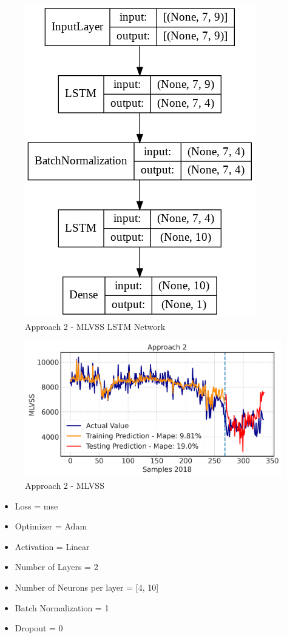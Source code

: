 \begin{figure}[h]
\centering
 \includegraphics[width=0.4\linewidth]{figures/Ch5/App2_MLVSS.png}
\caption{Approach 2 - MLVSS LSTM Network}
\label{f:App2-MLVSS-nn}
\end{figure}

\begin{figure}[h]
\centering
\includegraphics[width=\linewidth]{figures/Ch5/MVLSS-approach2.png}
\caption{Approach 2 - MLVSS}
\label{f:App2-MLVSS}
\end{figure}

\begin{itemize}
    \item Loss = mse
    \item Optimizer = Adam
    \item Activation =  Linear
    \item Number of Layers = 2
    \item Number of Neurons per layer = [4, 10]
    \item Batch Normalization = 1
    \item Dropout = 0
\end{itemize}


